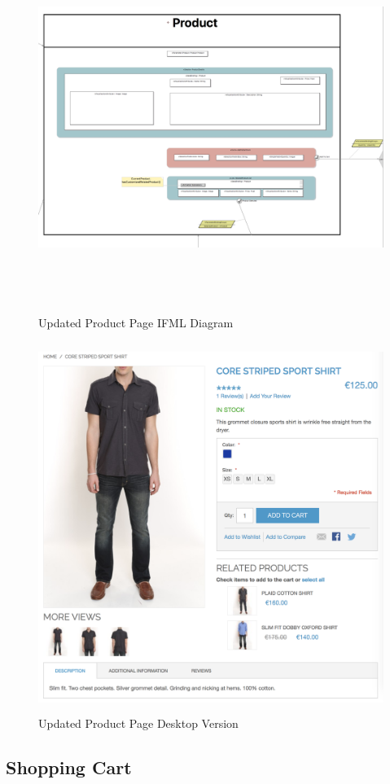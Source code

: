 \vspace{0.5cm}
\begin{figure}[H]
  \centering
    \includegraphics[height=12cm]{images/diagrams/after/ifml-product.png}
  \caption{Updated Product Page IFML Diagram}
  \label{fig:ifml-after-product}
\end{figure}

\begin{figure}[H]
  \centering
    \includegraphics[height=12cm]{images/diagrams/after/desktop-product.png}
  \caption{Updated Product Page Desktop Version}
  \label{fig:desktop-after-product}
\end{figure}
\vspace{0.5cm}

\subsection{Shopping Cart}

